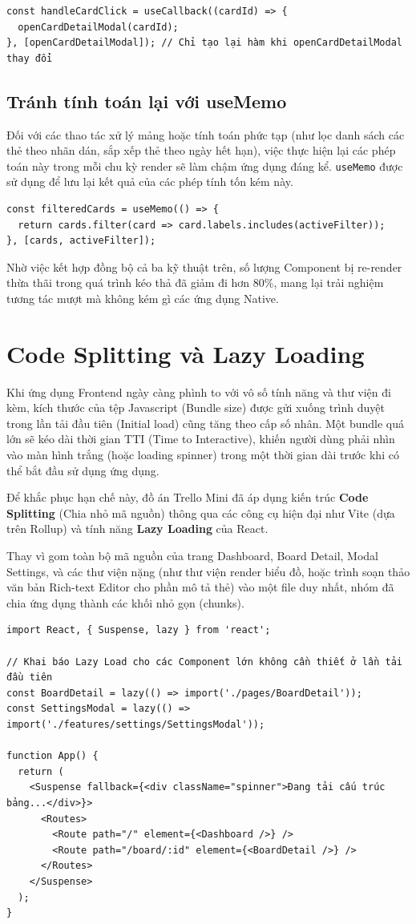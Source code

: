\begin{Verbatim}
const handleCardClick = useCallback((cardId) => {
  openCardDetailModal(cardId);
}, [openCardDetailModal]); // Chỉ tạo lại hàm khi openCardDetailModal thay đổi
\end{Verbatim}

\subsection{Tránh tính toán lại với useMemo}
Đối với các thao tác xử lý mảng hoặc tính toán phức tạp (như lọc danh sách các thẻ theo nhãn dán, sắp xếp thẻ theo ngày hết hạn), việc thực hiện lại các phép toán này trong mỗi chu kỳ render sẽ làm chậm ứng dụng đáng kể. \texttt{useMemo} được sử dụng để lưu lại kết quả của các phép tính tốn kém này.

\begin{Verbatim}
const filteredCards = useMemo(() => {
  return cards.filter(card => card.labels.includes(activeFilter));
}, [cards, activeFilter]);
\end{Verbatim}
Nhờ việc kết hợp đồng bộ cả ba kỹ thuật trên, số lượng Component bị re-render thừa thãi trong quá trình kéo thả đã giảm đi hơn 80\%, mang lại trải nghiệm tương tác mượt mà không kém gì các ứng dụng Native.

\section{Code Splitting và Lazy Loading}
Khi ứng dụng Frontend ngày càng phình to với vô số tính năng và thư viện đi kèm, kích thước của tệp Javascript (Bundle size) được gửi xuống trình duyệt trong lần tải đầu tiên (Initial load) cũng tăng theo cấp số nhân. Một bundle quá lớn sẽ kéo dài thời gian TTI (Time to Interactive), khiến người dùng phải nhìn vào màn hình trắng (hoặc loading spinner) trong một thời gian dài trước khi có thể bắt đầu sử dụng ứng dụng.

Để khắc phục hạn chế này, đồ án Trello Mini đã áp dụng kiến trúc \textbf{Code Splitting} (Chia nhỏ mã nguồn) thông qua các công cụ hiện đại như Vite (dựa trên Rollup) và tính năng \textbf{Lazy Loading} của React.

Thay vì gom toàn bộ mã nguồn của trang Dashboard, Board Detail, Modal Settings, và các thư viện nặng (như thư viện render biểu đồ, hoặc trình soạn thảo văn bản Rich-text Editor cho phần mô tả thẻ) vào một file duy nhất, nhóm đã chia ứng dụng thành các khối nhỏ gọn (chunks).

\begin{Verbatim}
import React, { Suspense, lazy } from 'react';

// Khai báo Lazy Load cho các Component lớn không cần thiết ở lần tải đầu tiên
const BoardDetail = lazy(() => import('./pages/BoardDetail'));
const SettingsModal = lazy(() => import('./features/settings/SettingsModal'));

function App() {
  return (
    <Suspense fallback={<div className="spinner">Đang tải cấu trúc bảng...</div>}>
      <Routes>
        <Route path="/" element={<Dashboard />} />
        <Route path="/board/:id" element={<BoardDetail />} />
      </Routes>
    </Suspense>
  );
}
\end{Verbatim}

